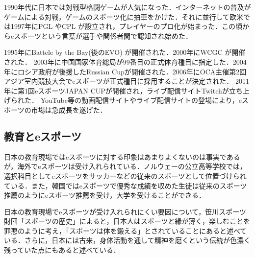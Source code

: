 1990年代に日本では対戦型格闘ゲームが人気になった．インターネットの普及がゲームによる対戦，ゲームのスポーツ化に拍車をかけた．それに並行して欧米では1997年にPGL%
やCPL%
が設立され，プレイヤーのプロ化が始まった．この頃からeスポーツという言葉が選手や関係者間で認知され始めた．

1995年にBattele by the Bay(後のEVO)%
が開催された．2000年にWCGC%
が開催された．%
2003年に中国国家体育総局が99番目の正式体育種目に指定した．2004年にロシア政府が後援したRussian Cupが開催された．2006年にOCA主催第2回アジア室内競技大会でeスポーツが正式種目に採用することが決定された．%
2011年に第1回eスポーツJAPAN CUPが開催され，ライブ配信サイトTwitchが立ち上げられた．%
YouTube等の動画配信サイトやライブ配信サイトの登場により，eスポーツの市場は急成長を遂げた．


\subsection{教育とeスポーツ}

日本の教育現場ではeスポーツに対する印象はあまりよくないのは事実であるが，海外でeスポーツは受け入れられている．ノルウェーの公立高等学校では，選択科目としてeスポーツをサッカーなどの従来のスポーツとして位置づけられている．また，韓国ではeスポーツで優秀な成績を収めた生徒は従来のスポーツ推薦のようにeスポーツ推薦を受け，大学を受けることができる．

日本の教育現場でeスポーツが受け入れられにくい要因について，笹川スポーツ財団「スポーツの歴史」によると，日本人はスポーツと縁が薄く，楽しむことを罪悪のように考え，「スポーツは体を鍛える」とされていることにあると述べている．さらに，日本には古来，身体活動を通して精神を磨くという伝統が色濃く残っていた点にもあると述べている．%
